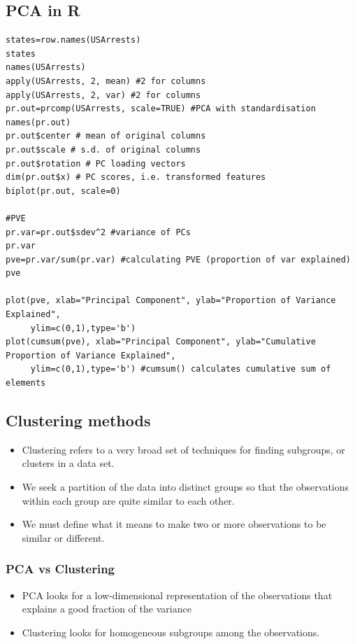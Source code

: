 \documentclass{article}
\begin{document}
\subsection{PCA in R}

\begin{lstlisting}
states=row.names(USArrests)
states
names(USArrests)
apply(USArrests, 2, mean) #2 for columns
apply(USArrests, 2, var) #2 for columns
pr.out=prcomp(USArrests, scale=TRUE) #PCA with standardisation
names(pr.out)
pr.out$center # mean of original columns
pr.out$scale # s.d. of original columns
pr.out$rotation # PC loading vectors
dim(pr.out$x) # PC scores, i.e. transformed features
biplot(pr.out, scale=0)

#PVE
pr.var=pr.out$sdev^2 #variance of PCs
pr.var
pve=pr.var/sum(pr.var) #calculating PVE (proportion of var explained)
pve

plot(pve, xlab="Principal Component", ylab="Proportion of Variance Explained", 
     ylim=c(0,1),type='b')
plot(cumsum(pve), xlab="Principal Component", ylab="Cumulative Proportion of Variance Explained", 
     ylim=c(0,1),type='b') #cumsum() calculates cumulative sum of elements

\end{lstlisting}

\subsection{Clustering methods}

\begin{itemize}
    \item Clustering refers to a very broad set of techniques for finding subgroups, or clusters in a data set.
    \item We seek a partition of the data into distinct groups so that the observations within each group are quite similar to each other.
    \item We must define what it means to make two or more observations to be similar or different.
\end{itemize}

\subsubsection{PCA vs Clustering}
\begin{itemize}
    \item PCA looks for a low-dimensional representation of the observations that explains a good fraction of the variance
    \item Clustering looks for homogeneous subgroups among the observations.
\end{itemize}
\end{document}
